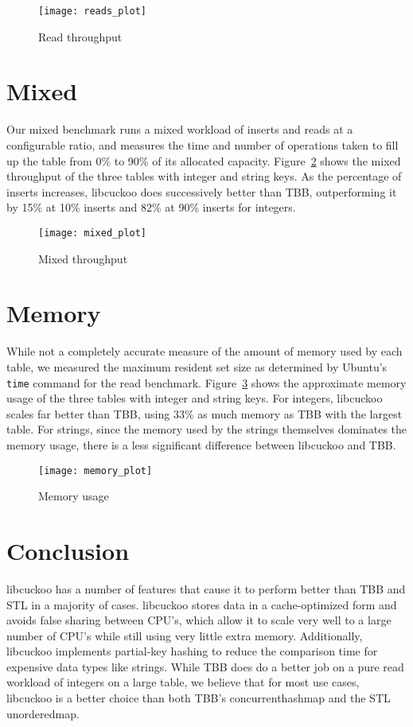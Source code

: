 \documentclass[12pt, letterpaper]{article}
\newcommand{\myfigwidth}{0.9\textwidth}
\begin{document}
\begin{figure}
  \centering
  \texttt{[image: reads\_plot]}
  \caption{Read throughput}
  \label{fig:reads}
\end{figure}

\section{Mixed}
\label{sec:mixed}

Our mixed benchmark runs a mixed workload of inserts and reads at a
configurable ratio, and measures the time and number of operations
taken to fill up the table from 0\% to 90\% of its allocated capacity.
Figure~\ref{fig:mixed} shows the mixed throughput of the three tables
with integer and string keys. As the percentage of inserts increases,
libcuckoo does successively better than TBB, outperforming it by 15\%
at 10\% inserts and 82\% at 90\% inserts for integers.

\begin{figure}
  \centering
  \texttt{[image: mixed\_plot]}
  \caption{Mixed throughput}
  \label{fig:mixed}
\end{figure}

\section{Memory}
\label{sec:memory}

While not a completely accurate measure of the amount of memory used
by each table, we measured the maximum resident set size as determined
by Ubuntu's \texttt{time} command for the read benchmark.
Figure~\ref{fig:memory} shows the approximate memory usage of the
three tables with integer and string keys. For integers, libcuckoo
scales far better than TBB, using 33\% as much memory as TBB with the
largest table. For strings, since the memory used by the strings
themselves dominates the memory usage, there is a less significant
difference between libcuckoo and TBB.

\begin{figure}
  \centering
  \texttt{[image: memory\_plot]}
  \caption{Memory usage}
  \label{fig:memory}
\end{figure}

\section{Conclusion}
\label{sec:conclusion}

libcuckoo has a number of features that cause it to perform better
than TBB and STL in a majority of cases. libcuckoo stores data in a
cache-optimized form and avoids false sharing between CPU's, which
allow it to scale very well to a large number of CPU's while still
using very little extra memory. Additionally, libcuckoo implements
partial-key hashing to reduce the comparison time for expensive data
types like strings. While TBB does do a better job on a pure read
workload of integers on a large table, we believe that for most use
cases, libcuckoo is a better choice than both TBB's
{concurrent\textunderscore hash\textunderscore map} and the STL
{unordered\textunderscore map}.
\end{document}
